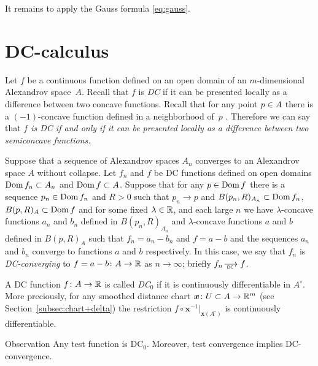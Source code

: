 It remains to apply the Gauss formula \ref{eq:gauss}.
\qeds




 
 
 
 

  
 
\section{DC-calculus}\label{sec:DC}

Let $f$ be a continuous function defined on an open domain of an $m$-dimensional Alexandrov space~$A$.
Recall that $f$ is \emph{DC} if it can be presented locally as a difference between two concave functions.
Recall that for any point $p\zz\in A$ there is a $(-1)$-concave function defined in a  neighborhood  of~$p$ \cite[3.6]{PerMorse}.
Therefore we can say that \textit{$f$ is DC if and only if it can be presented locally as a difference between two semiconcave functions.} 

Suppose that a sequence of Alexandrov spaces $A_n$ converges to an Alexandrov space $A$ without collapse.
Let $f_n$ and $f$ be DC functions defined on open domains $\Dom f_n\zz\subset A_n$ and $\Dom f \zz\subset A$.
Suppose that for any $p\in \mathop{\rm Dom} f$ there is a sequence $p_n\in \mathop{\rm Dom} f_n$ and $R>0$ such that $p_n\to p$ and $B(p_n,R)_{A_n}\subset \mathop{\rm Dom} f_n$, $B(p,R)_{A}\subset\mathop{\rm Dom} f$
and for some fixed $\lambda\in\mathbb{R}$, and each large $n$ we have $\lambda$-concave functions $a_n$ and $b_n$ defined in $B(p_n,R)_{A_n}$ and $\lambda$-concave functions $a$ and $b$ defined in $B(p,R)_{A}$
such that $f_n=a_n-b_n$ and $f=a-b$ and the sequences
$a_n$ and $b_n$ converge to functions $a$ and $b$ respectively.
In this case, we say that $f_n$ is \emph{DC-converging} to $f=a-b\colon A\to \mathbb{R}$ as $n\to\infty$; briefly $f_n\DCto f$.

A DC function $f\colon A\to \mathbb{R}$ is called \emph{DC$_0$} if it is continuously differentiable in $A^\circ$.
More preciously, for any smoothed distance chart $\bm{x}\colon U\subset A \to \mathbb{R}^m$ (see Section~\ref{subsec:chart+delta}) the restriction $f\circ\bm{x}^{-1}|_{\bm{x}(A^\circ)}$ is continuously differentiable.

{\sloppy

\begin{thm}{Observation}\label{obs:test-DC}
Any test function is DC$_0$.
Moreover, test convergence implies DC-convergence. 
\end{thm}

}

